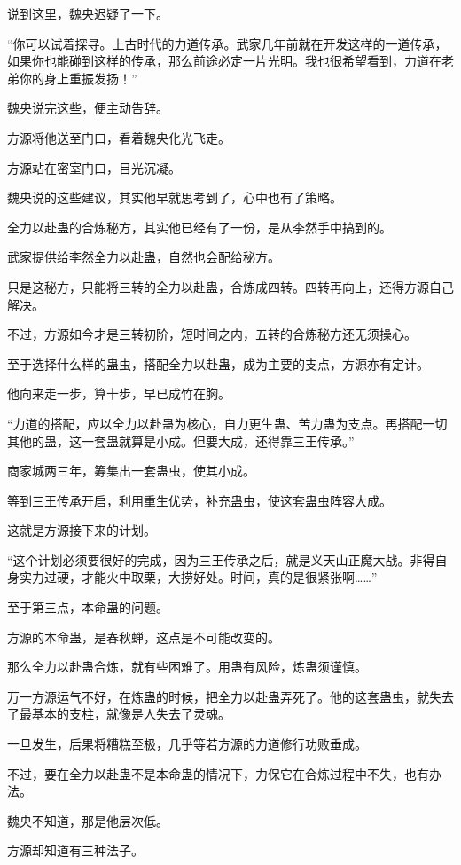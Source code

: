 \begin{this_body}
说到这里，魏央迟疑了一下。

“你可以试着探寻。上古时代的力道传承。武家几年前就在开发这样的一道传承，如果你也能碰到这样的传承，那么前途必定一片光明。我也很希望看到，力道在老弟你的身上重振发扬！”

魏央说完这些，便主动告辞。

方源将他送至门口，看着魏央化光飞走。

方源站在密室门口，目光沉凝。

魏央说的这些建议，其实他早就思考到了，心中也有了策略。

全力以赴蛊的合炼秘方，其实他已经有了一份，是从李然手中搞到的。

武家提供给李然全力以赴蛊，自然也会配给秘方。

只是这秘方，只能将三转的全力以赴蛊，合炼成四转。四转再向上，还得方源自己解决。

不过，方源如今才是三转初阶，短时间之内，五转的合炼秘方还无须操心。

至于选择什么样的蛊虫，搭配全力以赴蛊，成为主要的支点，方源亦有定计。

他向来走一步，算十步，早已成竹在胸。

“力道的搭配，应以全力以赴蛊为核心，自力更生蛊、苦力蛊为支点。再搭配一切其他的蛊，这一套蛊就算是小成。但要大成，还得靠三王传承。”

商家城两三年，筹集出一套蛊虫，使其小成。

等到三王传承开启，利用重生优势，补充蛊虫，使这套蛊虫阵容大成。

这就是方源接下来的计划。

“这个计划必须要很好的完成，因为三王传承之后，就是义天山正魔大战。非得自身实力过硬，才能火中取栗，大捞好处。时间，真的是很紧张啊……”

至于第三点，本命蛊的问题。

方源的本命蛊，是春秋蝉，这点是不可能改变的。

那么全力以赴蛊合炼，就有些困难了。用蛊有风险，炼蛊须谨慎。

万一方源运气不好，在炼蛊的时候，把全力以赴蛊弄死了。他的这套蛊虫，就失去了最基本的支柱，就像是人失去了灵魂。

一旦发生，后果将糟糕至极，几乎等若方源的力道修行功败垂成。

不过，要在全力以赴蛊不是本命蛊的情况下，力保它在合炼过程中不失，也有办法。

魏央不知道，那是他层次低。

方源却知道有三种法子。


\end{this_body}
